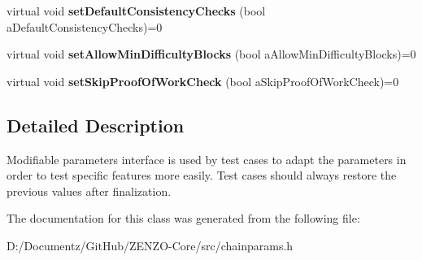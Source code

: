 \begin{DoxyCompactItemize}
virtual void {\bfseries set\+Default\+Consistency\+Checks} (bool a\+Default\+Consistency\+Checks)=0
\item 
\mbox{\label{class_c_modifiable_params_a6d2962f388f0b018e3d25db7cab5d94b}} 
virtual void {\bfseries set\+Allow\+Min\+Difficulty\+Blocks} (bool a\+Allow\+Min\+Difficulty\+Blocks)=0
\item 
\mbox{\label{class_c_modifiable_params_af9538f7ede9274968922f1cc019df0a2}} 
virtual void {\bfseries set\+Skip\+Proof\+Of\+Work\+Check} (bool a\+Skip\+Proof\+Of\+Work\+Check)=0
\end{DoxyCompactItemize}


\subsection{Detailed Description}
Modifiable parameters interface is used by test cases to adapt the parameters in order to test specific features more easily. Test cases should always restore the previous values after finalization. 

The documentation for this class was generated from the following file\+:\begin{DoxyCompactItemize}
\item 
D\+:/\+Documentz/\+Git\+Hub/\+Z\+E\+N\+Z\+O-\/\+Core/src/chainparams.\+h\end{DoxyCompactItemize}
